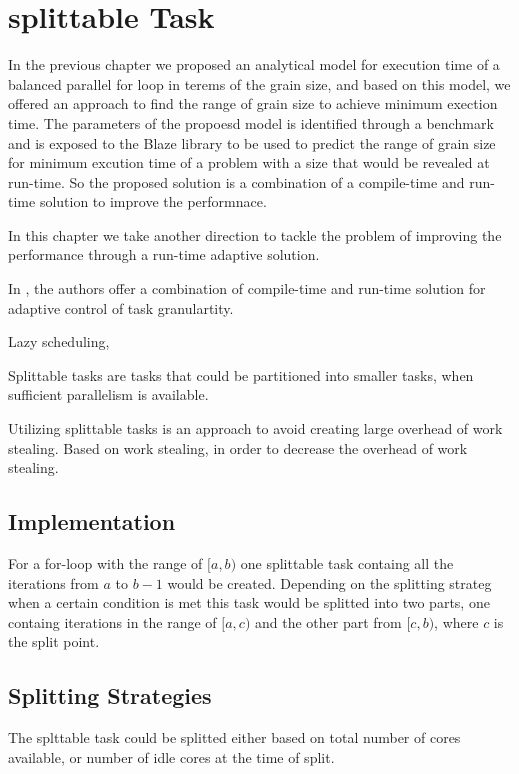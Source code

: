 \section{splittable Task}

In the previous chapter we proposed an analytical model for execution time of a balanced parallel for loop in terems of the grain size, and based on this model, we offered an approach to find the range of grain size to achieve minimum exection time. The parameters of the propoesd model is identified through a benchmark and is exposed to the Blaze library to be used to predict the range of grain size for minimum excution time of a problem with a size that would be revealed at run-time. So the proposed solution is a combination of a compile-time and run-time solution to improve the performnace.
  
In this chapter we take another direction to tackle the problem of improving the performance through a run-time adaptive solution.

In \cite{thoman2013adaptive}, the authors offer a combination of compile-time and run-time solution for adaptive control of task granulartity. 

Lazy scheduling, \cite{tzannes2014lazy}

Splittable tasks are tasks that could be partitioned into smaller tasks, when sufficient parallelism is available\cite{prell2016embracing}. 

Utilizing splittable tasks is an approach to avoid creating large overhead of work stealing. 
Based on work stealing, in order to decrease the overhead of work stealing. 

\cite{aguilar2019line}


\subsection{Implementation}
For a for-loop with the range of $[a,b)$ one splittable task containg all the iterations from $a$ to $b-1$ would be created. Depending on the splitting strateg when a certain condition is met this task would be splitted into two parts, one containg iterations in the range of $[a,c)$ and the other part from $[c,b)$, where $c$ is the split point.   

 
\subsection{Splitting Strategies}
The splttable task could be splitted either based on total number of cores available, or number of idle cores at the time of split. 

